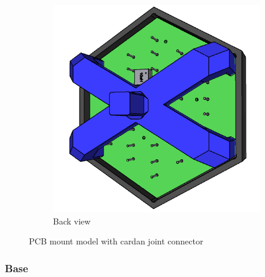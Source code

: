 \begin{figure}[ht]
\begin{subfigure}[b]{0.49\textwidth}
    \includegraphics[width=\textwidth]{src/assets/pictures/construction/pcb_mount.png}
    \caption{Back view}
    \label{fig:const:int:mount_back}
  \end{subfigure}
  \caption{PCB mount model with cardan joint connector}
  \label{fig:const:int:mount}
\end{figure}
%
\subsubsection*{Base}

